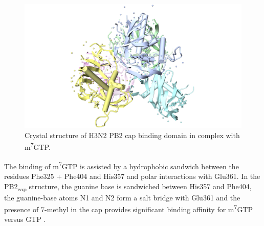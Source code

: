 \begin{figure}
\centering
\includegraphics[width=\linewidth]{../influenza/2VQZ.png}
\caption{Crystal structure of H3N2 PB2 cap binding domain in complex with m\textsuperscript{7}GTP.}
\label{influenza:2VQZ}
\end{figure}

The binding of m\textsuperscript{7}GTP is assisted by a hydrophobic sandwich between the residues Phe325 + Phe404 and His357 and polar interactions with Glu361. In the PB2\textsubscript{cap} structure, the guanine base is sandwiched between His357 and Phe404, the guanine-base atoms N1 and N2 form a salt bridge with Glu361 and the presence of 7-methyl in the cap provides significant binding affinity for m\textsuperscript{7}GTP versus GTP \citep{1192}.

